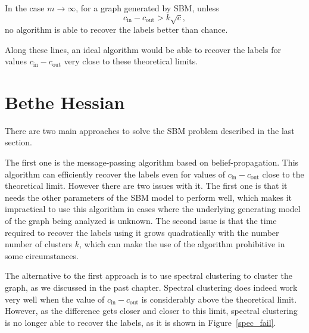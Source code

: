 \begin{conjecture}
In the case $m \rightarrow \infty$, for a graph generated by SBM, unless
   \begin{equation}
      c_\text{in} - c_\text{out} > k \sqrt{c},
   \end{equation}
   no algorithm is able to recover the labels better than chance.
\end{conjecture}

Along these lines, an ideal algorithm would be able to recover the labels for values $c_\text{in} - c_\text{out}$ very close to these theoretical limits.

\section{Bethe Hessian}
There are two main approaches to solve the SBM problem described in the last section. 

The first one is the message-passing algorithm based on belief-propagation.
This algorithm can efficiently recover the labels even for values of $c_\text{in} - c_\text{out}$ close to the theoretical limit.
However there are two issues with it.
The first one is that it needs the other parameters of the SBM model to perform well, which makes it impractical to use this algorithm in cases where the underlying generating model of the graph being analyzed is unknown.
The second issue is that the time required to recover the labels using it grows quadratically with the number number of clusters $k$, which can make the use of the algorithm prohibitive in some circumstances.

The alternative to the first approach is to use spectral clustering to cluster the graph, as we discussed in the past chapter.
Spectral clustering does indeed work very well when the value of $c_\text{in} - c_\text{out}$ is considerably above the theoretical limit.
However, as the difference gets closer and closer to this limit, spectral clustering is no longer able to recover the labels, as it is shown in Figure~\vref{spec_fail}.

